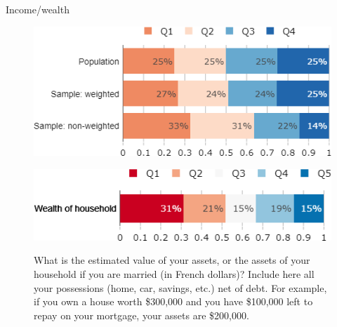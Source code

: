 \begin{framefont}{\small}
\begin{frame}{Income/wealth}%
\begin{figure}[h!]
\centering
\captionsetup{justification=centering}
\caption{What was the annual income of your household in 2019 (before withholding tax, for you and those who live with you)?}
\includegraphics[width=.43\paperwidth]{../figures/FR/income_FR_comp.png} \\
\caption{\small What is the estimated value of your assets, or the assets of your household if you are married (in French dollars)? Include here all your possessions (home, car, savings, etc.) net of debt. For example, if you own a house worth \$300,000 and you have \$100,000 left to repay on your mortgage, your assets are \$200,000.}
\includegraphics[width=.43\paperwidth]{../figures/FR/wealth_FR.png} \\
\end{figure}
\end{frame}


\end{framefont}
